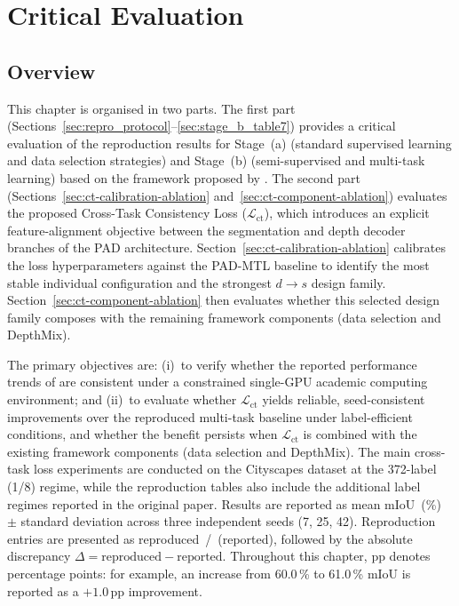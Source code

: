 \chapter{Critical Evaluation}
\label{chap:evaluation}

\section{Overview}
\label{sec:repro_overview}

\noindent
This chapter is organised in two parts. The first part
(Sections~\ref{sec:repro_protocol}--\ref{sec:stage_b_table7}) provides a
critical evaluation of the reproduction results for Stage~(a) (standard
supervised learning and data selection strategies) and Stage~(b)
(semi-supervised and multi-task learning) based on the framework proposed
by \cite{hoyer2023improving}. The second part
(Sections~\ref{sec:ct-calibration-ablation}
and~\ref{sec:ct-component-ablation}) evaluates the proposed Cross-Task
Consistency Loss ($\mathcal{L}_\text{ct}$), which introduces an explicit
feature-alignment objective between the segmentation and depth decoder
branches of the PAD architecture.
Section~\ref{sec:ct-calibration-ablation} calibrates the loss
hyperparameters against the PAD-MTL baseline to identify the most stable
individual configuration and the strongest $d{\rightarrow}s$ design
family. Section~\ref{sec:ct-component-ablation} then evaluates whether
this selected design family composes with the remaining framework
components (data selection and DepthMix).

The primary objectives are: (i)~to verify whether the reported
performance trends of \cite{hoyer2023improving} are consistent under a
constrained single-GPU academic computing environment; and
(ii)~to evaluate whether $\mathcal{L}_\text{ct}$ yields reliable,
seed-consistent improvements over the reproduced multi-task baseline
under label-efficient conditions, and whether the benefit persists when
$\mathcal{L}_\text{ct}$ is combined with the existing framework
components (data selection and DepthMix). The main cross-task loss
experiments are conducted on the Cityscapes dataset at the 372-label
(1/8) regime, while the reproduction tables also include the additional
label regimes reported in the original paper. Results are reported as
mean mIoU~(\%) $\pm$ standard deviation across three independent seeds
(7, 25, 42). Reproduction entries are presented as
reproduced~/~{\scriptsize (reported)}, followed by the absolute
discrepancy $\Delta = \text{reproduced} - \text{reported}$. Throughout
this chapter, pp denotes percentage points: for example, an increase from
60.0\,\% to 61.0\,\% mIoU is reported as a $+1.0$\,pp improvement.

